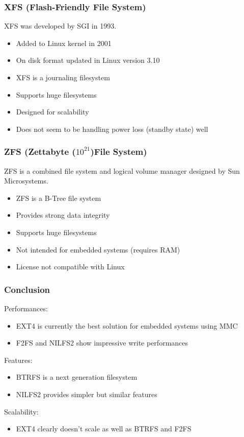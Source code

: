 \documentclass[resume]{subfiles}
\begin{document}
\subsubsection{XFS (Flash-Friendly File System)}
XFS was developed by SGI in 1993.
\begin{itemize}
    \item Added to Linux kernel in 2001
    \item On disk format updated in Linux version 3.10
    \item XFS is a journaling filesystem
    \item Supports huge filesystems
    \item Designed for scalability
    \item Does not seem to be handling power loss (standby state) well
\end{itemize}

\subsubsection{ZFS (Zettabyte ($10^21$)File System)}
ZFS is a combined file system and logical volume manager designed by Sun Microsystems.
\begin{itemize}
    \item ZFS is a B-Tree file system
    \item Provides strong data integrity
    \item Supports huge filesystems
    \item Not intended for embedded systems (requires RAM)
    \item License not compatible with Linux
\end{itemize}

\subsubsection{Conclusion}
Performances:
\begin{itemize}
    \item EXT4 is currently the best solution for embedded systems using MMC
    \item F2FS and NILFS2 show impressive write performances
\end{itemize}
Features:
\begin{itemize}
    \item BTRFS is a next generation filesystem
    \item NILFS2 provides simpler but similar features
\end{itemize}
Scalability:
\begin{itemize}
    \item EXT4 clearly doesn’t scale as well as BTRFS and F2FS
\end{itemize}
\end{document}
